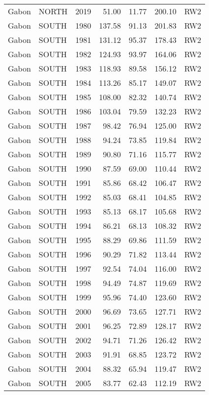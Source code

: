 \begin{longtable}{lllrrrl}
  Gabon & NORTH & 2019 & 51.00 & 11.77 & 200.10 & RW2 \\ 
  Gabon & SOUTH & 1980 & 137.58 & 91.13 & 201.83 & RW2 \\ 
  Gabon & SOUTH & 1981 & 131.12 & 95.37 & 178.43 & RW2 \\ 
  Gabon & SOUTH & 1982 & 124.93 & 93.97 & 164.06 & RW2 \\ 
  Gabon & SOUTH & 1983 & 118.93 & 89.58 & 156.12 & RW2 \\ 
  Gabon & SOUTH & 1984 & 113.26 & 85.17 & 149.07 & RW2 \\ 
  Gabon & SOUTH & 1985 & 108.00 & 82.32 & 140.74 & RW2 \\ 
  Gabon & SOUTH & 1986 & 103.04 & 79.59 & 132.23 & RW2 \\ 
  Gabon & SOUTH & 1987 & 98.42 & 76.94 & 125.00 & RW2 \\ 
  Gabon & SOUTH & 1988 & 94.24 & 73.85 & 119.84 & RW2 \\ 
  Gabon & SOUTH & 1989 & 90.80 & 71.16 & 115.77 & RW2 \\ 
  Gabon & SOUTH & 1990 & 87.59 & 69.00 & 110.44 & RW2 \\ 
  Gabon & SOUTH & 1991 & 85.86 & 68.42 & 106.47 & RW2 \\ 
  Gabon & SOUTH & 1992 & 85.03 & 68.41 & 104.85 & RW2 \\ 
  Gabon & SOUTH & 1993 & 85.13 & 68.17 & 105.68 & RW2 \\ 
  Gabon & SOUTH & 1994 & 86.21 & 68.13 & 108.32 & RW2 \\ 
  Gabon & SOUTH & 1995 & 88.29 & 69.86 & 111.59 & RW2 \\ 
  Gabon & SOUTH & 1996 & 90.29 & 71.82 & 113.44 & RW2 \\ 
  Gabon & SOUTH & 1997 & 92.54 & 74.04 & 116.00 & RW2 \\ 
  Gabon & SOUTH & 1998 & 94.49 & 74.87 & 119.69 & RW2 \\ 
  Gabon & SOUTH & 1999 & 95.96 & 74.40 & 123.60 & RW2 \\ 
  Gabon & SOUTH & 2000 & 96.69 & 73.65 & 127.71 & RW2 \\ 
  Gabon & SOUTH & 2001 & 96.25 & 72.89 & 128.17 & RW2 \\ 
  Gabon & SOUTH & 2002 & 94.71 & 71.26 & 126.42 & RW2 \\ 
  Gabon & SOUTH & 2003 & 91.91 & 68.85 & 123.72 & RW2 \\ 
  Gabon & SOUTH & 2004 & 88.32 & 65.94 & 119.47 & RW2 \\ 
  Gabon & SOUTH & 2005 & 83.77 & 62.43 & 112.19 & RW2 \\ 

\end{longtable}
